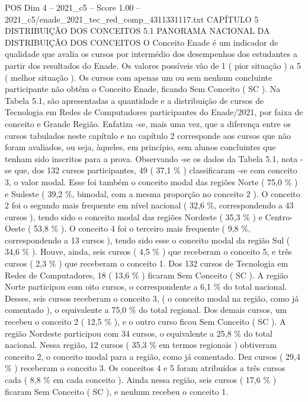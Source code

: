 \begin{textsample}{POS Dim 4 – 2021\_c5 – Score 1.00 – 2021\_c5/enade\_2021\_tec\_red\_comp\_4311331117.txt}  \label{ex:f4_pos_216}
CAPÍTULO 5 DISTRIBUIÇÃO DOS CONCEITOS 5.1 PANORAMA NACIONAL DA DISTRIBUIÇÃO DOS CONCEITOS O Conceito Enade é um indicador de qualidade que avalia os cursos por intermédio dos desempenhos dos estudantes a partir dos resultados do Enade.
Os valores possíveis vão de 1 ( pior situação ) a 5 ( melhor situação ).
Os cursos com apenas um ou sem nenhum concluinte participante não obtêm o Conceito Enade, ficando Sem Conceito ( SC ).
Na Tabela 5.1, são apresentadas a quantidade e a distribuição de cursos de Tecnologia em Redes de Computadores participantes do Enade/2021, por faixa de conceito e Grande Região.
Enfatiza -se, mais uma vez, que a diferença entre os cursos tabulados neste capítulo e no capítulo 2 corresponde aos cursos que não foram avaliados, ou seja, àqueles, em princípio, sem alunos concluintes que tenham sido inscritos para a prova.
Observando -se os dados da Tabela 5.1, nota -se que, dos 132 cursos participantes, 49 ( 37,1 \% ) classificaram -se com conceito 3, o valor modal.
Esse foi também o conceito modal das regiões Norte ( 75,0 \% ) e Sudeste ( 39,2 \%, bimodal, com a mesma proporção no conceito 2 ).
O conceito 2 foi o segundo mais frequente em nível nacional ( 32,6 \%, correspondendo a 43 cursos ), tendo sido o conceito modal das regiões Nordeste ( 35,3 \% ) e Centro-Oeste ( 53,8 \% ).
O conceito 4 foi o terceiro mais frequente ( 9,8 \%, correspondendo a 13 cursos ), tendo sido esse o conceito modal da região Sul ( 34,6 \% ).
Houve, ainda, seis cursos ( 4,5 \% ) que receberam o conceito 5, e três cursos ( 2,3 \% ) que receberam o conceito 1.
Dos 132 cursos de Tecnologia em Redes de Computadores, 18 ( 13,6 \% ) ficaram Sem Conceito ( SC ).
A região Norte participou com oito cursos, o correspondente a 6,1 \% do total nacional.
Desses, seis cursos receberam o conceito 3, ( o conceito modal na região, como já comentado ), o equivalente a 75,0 \% do total regional.
Dos demais cursos, um recebeu o conceito 2 ( 12,5 \% ), e o outro curso ficou Sem Conceito ( SC ).
A região Nordeste participou com 34 cursos, o equivalente a 25,8 \% do total nacional.
Nessa região, 12 cursos ( 35,3 \% em termos regionais ) obtiveram conceito 2, o conceito modal para a região, como já comentado.
Dez cursos ( 29,4 \% ) receberam o conceito 3.
Os conceitos 4 e 5 foram atribuídos a três cursos cada ( 8,8 \% em cada conceito ).
Ainda nessa região, seis cursos ( 17,6 \% ) ficaram Sem Conceito ( SC ), e nenhum recebeu o conceito 1.

\end{textsample}
